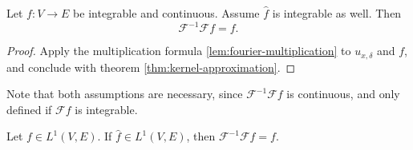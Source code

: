 \begin{theorem}
  \label{thm:fourier-inversion}
  Let $f:V\to E$ be integrable and continuous. Assume $\widehat f$ is integrable as well. Then
  $$\mathcal F^{-1}\mathcal F f=f.$$
  \leanok
\end{theorem}
\begin{proof}
\leanok
Apply the multiplication formula \ref{lem:fourier-multiplication} to $u_{x,\delta}$ and $f$, and conclude with
theorem \ref{thm:kernel-approximation}.
\end{proof}

\begin{remark}
  Note that both assumptions are necessary, since $\mathcal F^{-1}\mathcal Ff$ is continuous, and
  only defined if $\mathcal Ff$ is integrable.
\end{remark}

\begin{theorem}
  \label{thm:fourier-inversion-L1}
  \leanok
  Let $f\in L^1(V,E)$. If $\widehat f\in L^1(V,E)$, then $\mathcal F^{-1}\mathcal Ff=f$.
\end{theorem}

